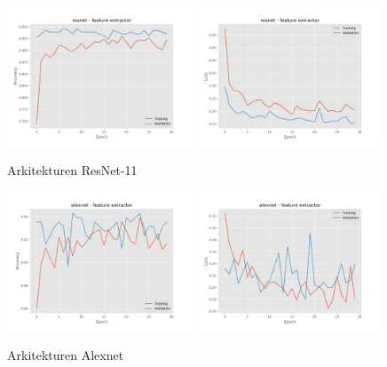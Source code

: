 \documentclass{kththesis}
\begin{document}
    \begin{figure}
      \centering
      \includegraphics[width=0.49\textwidth]{"./balcony/balcony-20split - acc - resnet - feature extractor"}
      \includegraphics[width=0.49\textwidth]{"./balcony/balcony-20split - loss - resnet - feature extractor"}
      \caption{Arkitekturen ResNet-11}
    \end{figure}
    \begin{figure}
      \centering
      \includegraphics[width=0.49\textwidth]{"./balcony/balcony-20split - acc - alexnet - feature extractor"}
      \includegraphics[width=0.49\textwidth]{"./balcony/balcony-20split - loss - alexnet - feature extractor"}
      \caption{Arkitekturen Alexnet}
    \end{figure}
\end{document}
